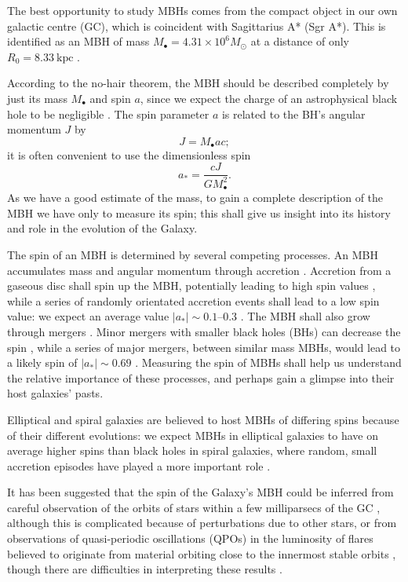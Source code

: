 \documentclass[useAMS,usedcolumn,usegraphicx,usenatbib]{mn2e}
\newcommand{\units}[1]{\ensuremath{~\mathrm{#1}}}
\begin{document}
The best opportunity to study MBHs comes from the compact object in our own galactic centre (GC), which is coincident with Sagittarius A* (Sgr A*). This is identified as an MBH of mass $M_\bullet = 4.31 \times 10^6 M_\odot$ at a distance of only $R_0 = 8.33\units{kpc}$ \citep{Gillessen2009}.

According to the no-hair theorem, the MBH should be described completely by just its mass $M_\bullet$ and spin $a$, since we expect the charge of an astrophysical black hole to be negligible \citep{Israel1967, Israel1968, Carter1971, Hawking1972, Robinson1975, Chandrasekhar1998}. The spin parameter $a$ is related to the BH's angular momentum $J$ by
\begin{equation}
J = M_\bullet ac;
\end{equation}
it is often convenient to use the dimensionless spin
\begin{equation}
a_\ast = \frac{cJ}{GM_\bullet^2}.
\end{equation}
As we have a good estimate of the mass, to gain a complete description of the MBH we have only to measure its spin; this shall give us insight into its history and role in the evolution of the Galaxy.

The spin of an MBH is determined by several competing processes. An MBH accumulates mass and angular momentum through accretion \citep{Volonteri2010}. Accretion from a gaseous disc shall spin up the MBH, potentially leading to high spin values \citep{Volonteri2005}, while a series of randomly orientated accretion events shall lead to a low spin value: we expect an average value $|a_\ast| \sim 0.1$--$0.3$ \citep*{King2006, King2008}. The MBH shall also grow through mergers \citep{Yu2002, Malbon2007}. Minor mergers with smaller black holes (BHs) can decrease the spin \citep*{Hughes2003, Gammie2004}, while a series of major mergers, between similar mass MBHs, would lead to a likely spin of $|a_\ast| \sim 0.69$ \citep{Berti2008, Berti2007, Gonzalez2007}. Measuring the spin of MBHs shall help us understand the relative importance of these processes, and perhaps gain a glimpse into their host galaxies' pasts.

Elliptical and spiral galaxies are believed to host MBHs of differing spins because of their different evolutions: we expect MBHs in elliptical galaxies to have on average higher spins than black holes in spiral galaxies, where random, small accretion episodes have played a more important role \citep*{Volonteri2007, Sikora2007}.

It has been suggested that the spin of the Galaxy's MBH could be inferred from careful observation of the orbits of stars within a few milliparsecs of the GC \citep{Merritt2010}, although this is complicated because of perturbations due to other stars, or from observations of quasi-periodic oscillations (QPOs) in the luminosity of flares believed to originate from material orbiting close to the innermost stable orbits \citep{Genzel2003a, Belanger2006, Trippe2007, Hamaus2009, Kato2010}, though there are difficulties in interpreting these results \citep{Psaltis2008a}.
\end{document}
